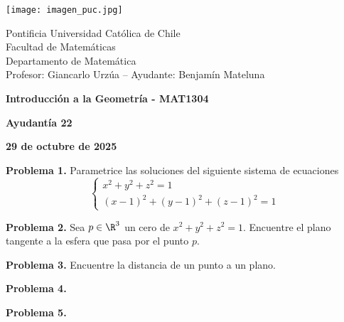 \documentclass{article}
\begin{document}
\begin{minipage}{2.5cm}
    \texttt{[image: imagen\_puc.jpg]}
\end{minipage}
\begin{minipage}{14cm}
    {\sc Pontificia Universidad Católica de Chile\\
    Facultad de Matemáticas\\
    Departamento de Matemática\\
    Profesor: Giancarlo Urzúa -- Ayudante: Benjamín Mateluna}
\end{minipage}
\vspace{1ex}

{\centerline{\bf Introducción a la Geometría - MAT1304}
\centerline{\bf Ayudantía 22}}
\centerline{\bf 29 de octubre de 2025}

\vspace{1cm}
\noindent\textbf{Problema 1.} Parametrice las soluciones del siguiente sistema de ecuaciones
\begin{equation*}
    \begin{cases}
        x^{2}+y^{2}+z^{2}=1 \\
        (x-1)^{2}+(y-1)^{2}+(z-1)^{2}=1
    \end{cases}
\end{equation*}

\vspace{5mm}
\noindent\textbf{Problema 2.} Sea $p\in\R^{3}$ un cero de $x^{2}+y^{2}+z^{2}=1$. Encuentre el 
plano tangente a la esfera que pasa por el punto $p$.

\vspace{5mm}
\noindent\textbf{Problema 3.} Encuentre la distancia de un punto a un plano.

\vspace{5mm}
\noindent\textbf{Problema 4.} 

\vspace{5mm}
\noindent\textbf{Problema 5.} 

\end{document}
